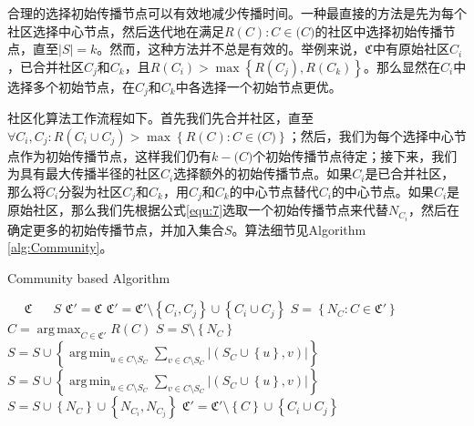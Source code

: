 \documentclass[UTF8]{ctexart}
\DeclareMathOperator*{\argmin}{arg\,min}
\DeclareMathOperator*{\argmax}{arg\,max}
\begin{document}
\par 合理的选择初始传播节点可以有效地减少传播时间。一种最直接的方法是先为每个社区选择中心节点，然后迭代地在满足$R(C):C \in \mathfrak(C)$的社区中选择初始传播节点，直至$\left | S \right | = k$。然而，这种方法并不总是有效的。举例来说，$\mathfrak{C}$中有原始社区$C_i$，已合并社区$C_j$和$C_k$，且$R(C_i) > \max \left \{ R(C_j),R(C_k) \right \}$。那么显然在$C_i$中选择多个初始节点，在$C_j$和$C_k$中各选择一个初始节点更优。
\par 社区化算法工作流程如下。首先我们先合并社区，直至$\forall C_i,C_j:R(C_i \cup C_j)> \max \left \{ R(C):C \in \mathfrak(C) \right \}$；然后，我们为每个选择中心节点作为初始传播节点，这样我们仍有$k-\mathfrak(C)$个初始传播节点待定；接下来，我们为具有最大传播半径的社区$C_i$选择额外的初始传播节点。如果$C_i$是已合并社区，那么将$C_i$分裂为社区$C_j$和$C_k$，用$C_j$和$C_k$的中心节点替代$C_i$的中心节点。如果$C_i$是原始社区，那么我们先根据公式\eqref{equ:7}选取一个初始传播节点来代替$N_{C_i}$，然后在确定更多的初始传播节点，并加入集合$S$。算法细节见Algorithm \ref{alg:Community}。
\begin{algorithm}[htb]   
\caption{ Community based Algorithm}   
\label{alg:Community}   
\begin{algorithmic}[1] %
\REQUIRE ~~ %
$\mathfrak{C}$ 
\ENSURE ~~ %
$S$
\label{ code:fram:extract }%
\STATE  $\mathfrak{C}' = \mathfrak{C}$
\STATE $\mathfrak{C}' = \mathfrak{C}'\setminus \left \{ C_i,C_j\right \} \cup \left \{ C_i \cup C_j\right \}$
\ENDWHILE
\STATE $S = \left \{N_C:C \in \mathfrak{C}' \right \}$
\STATE $C = \argmax_{C\in \mathfrak{C}'}R(C)$
\STATE $S = S \setminus \left \{ N_C \right \}$
\STATE $S = S \cup \left \{ \argmin_{u \in C \setminus S_C} \sum_{v \in C \setminus S_C} \left | (S_C \cup \left \{u \right \},v ) \right | \right \}$
\ENDIF
\STATE $S = S \cup \left \{ \argmin_{u \in C \setminus S_C} \sum_{v \in C \setminus S_C} \left | (S_C \cup \left \{u \right \},v ) \right | \right \}$
\ELSE
\STATE $S = S \cup \left \{ N_C \right \} \cup \left \{ N_{C_i},N_{C_j} \right \}$
\STATE $\mathfrak{C}' = \mathfrak{C}' \setminus \left \{ C \right \} \cup \left \{ C_i \cup C_j\right \}$
\ENDIF
\ENDWHILE
\end{algorithmic}  
\end{algorithm}  
\end{document}

